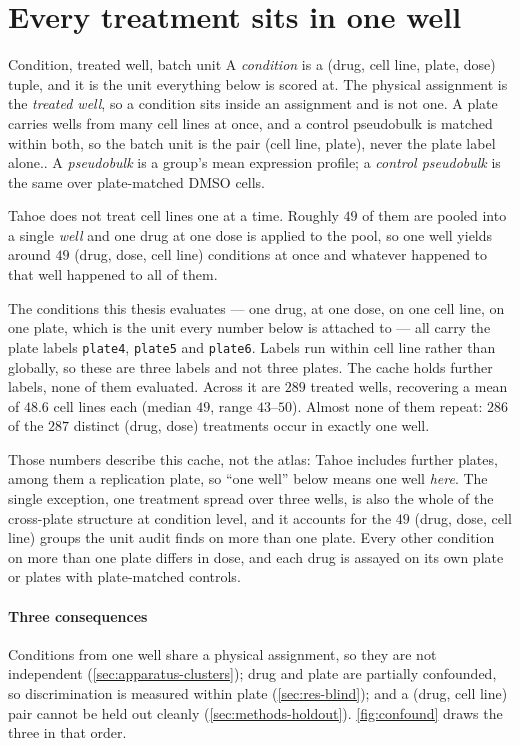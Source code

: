 \section{Every treatment sits in one well}
\begin{defn}{Condition, treated well, batch unit}
  A \emph{condition} is a (drug, cell line, plate, dose) tuple, and it is the unit
  everything below is scored at. The physical assignment is the \emph{treated
  well}, so a condition sits inside an assignment and is not one. A plate carries wells from many cell lines at once, and a control pseudobulk is
  matched within both, so the batch unit is the pair (cell line, plate), never the
  plate label alone.. A \emph{pseudobulk} is a group's mean
  expression profile; a \emph{control pseudobulk} is the same over plate-matched
  DMSO cells.
  \end{defn}

Tahoe does not treat cell lines one at a time. Roughly $49$ of them are pooled
into a single \emph{well} and one drug at one dose is applied to the pool, so
one well yields around $49$ (drug, dose, cell line) conditions at once and
whatever happened to that well happened to all of them.

The conditions this thesis evaluates --- one drug, at one dose, on one cell
line, on one plate, which is the unit every number below is attached to ---
all carry the plate labels \texttt{plate4}, \texttt{plate5} and \texttt{plate6}.
Labels run within cell line rather than globally, so these are three labels and
not three plates. The cache holds further labels, none of them evaluated.
Across it are $289$ treated wells, recovering a mean of $48.6$ cell lines each
(median $49$, range $43$--$50$). Almost none of them repeat: $286$ of the $287$
distinct (drug, dose) treatments occur in exactly one well.

Those numbers describe this cache, not the atlas: Tahoe includes further plates,
among them a replication plate, so ``one well'' below means one well
\emph{here}. The single exception, one treatment spread over three wells, is
also the whole of the cross-plate structure at condition level, and it accounts
for the $49$ (drug, dose, cell line) groups the unit audit finds on more than
one plate. Every other condition on more than one plate differs in dose, and
each drug is assayed on its own plate or plates with plate-matched controls.

\paragraph{Three consequences} Conditions from one well share a physical
assignment, so they are not independent (\cref{sec:apparatus-clusters}); drug
and plate are partially confounded, so discrimination is measured within plate
(\cref{sec:res-blind}); and a (drug, cell line) pair cannot be held out cleanly
(\cref{sec:methods-holdout}). \cref{fig:confound} draws the three in that
order.

